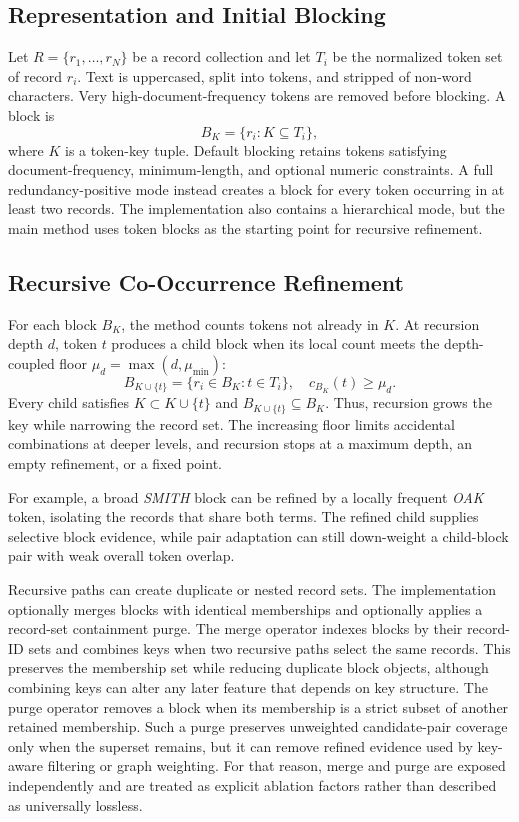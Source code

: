 \documentclass[conference]{IEEEtran}
\begin{document}
\subsection{Representation and Initial Blocking}
Let $R=\{r_1,\ldots,r_N\}$ be a record collection and let $T_i$ be the normalized token set of record $r_i$. Text is uppercased, split into tokens, and stripped of non-word characters. Very high-document-frequency tokens are removed before blocking. A block is
\begin{equation}
B_K=\{r_i:K\subseteq T_i\},
\end{equation}
where $K$ is a token-key tuple. Default blocking retains tokens satisfying document-frequency, minimum-length, and optional numeric constraints. A full redundancy-positive mode instead creates a block for every token occurring in at least two records. The implementation also contains a hierarchical mode, but the main method uses token blocks as the starting point for recursive refinement.

\subsection{Recursive Co-Occurrence Refinement}
For each block $B_K$, the method counts tokens not already in $K$. At recursion depth $d$, token $t$ produces a child block when its local count meets the depth-coupled floor $\mu_d=\max(d,\mu_{\min})$:
\begin{equation}
B_{K\cup\{t\}}=\{r_i\in B_K:t\in T_i\},\quad
c_{B_K}(t)\geq\mu_d.
\end{equation}
Every child satisfies $K\subset K\cup\{t\}$ and $B_{K\cup\{t\}}\subseteq B_K$. Thus, recursion grows the key while narrowing the record set. The increasing floor limits accidental combinations at deeper levels, and recursion stops at a maximum depth, an empty refinement, or a fixed point.

For example, a broad \emph{SMITH} block can be refined by a locally frequent \emph{OAK} token, isolating the records that share both terms. The refined child supplies selective block evidence, while pair adaptation can still down-weight a child-block pair with weak overall token overlap.

Recursive paths can create duplicate or nested record sets. The implementation optionally merges blocks with identical memberships and optionally applies a record-set containment purge. The merge operator indexes blocks by their record-ID sets and combines keys when two recursive paths select the same records. This preserves the membership set while reducing duplicate block objects, although combining keys can alter any later feature that depends on key structure. The purge operator removes a block when its membership is a strict subset of another retained membership. Such a purge preserves unweighted candidate-pair coverage only when the superset remains, but it can remove refined evidence used by key-aware filtering or graph weighting. For that reason, merge and purge are exposed independently and are treated as explicit ablation factors rather than described as universally lossless.
\end{document}
